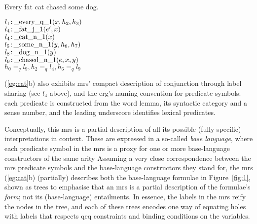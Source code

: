 \begin{examples}
\item   \label{eg:cat}
\begin{subexamples}
\item
Every fat cat chased some dog.
\item   $l_1\colon\!\mbox{\_every\_q\_1}(x,h_2,h_3)$\\
$l_4\colon\!\mbox{\_fat\_j\_1}(e',x)$\\
$l_4\colon\!\mbox{\_cat\_n\_1}(x)$\\
$l_5\colon\!\mbox{\_some\_n\_1}(y,h_6,h_7)$\\
$l_8\colon\!\mbox{\_dog\_n\_1}(y)$\\
$l_9\colon\!\mbox{\_chased\_n\_1}(e,x,y)$\\
$h_0 =_q l_9, h_2 =_q l_4, h_6 =_q l_9$
\end{subexamples}
\end{examples}
(\ref{eg:cat}b) also exhibits {\sc mrs}' compact description of
conjunction through label sharing (see $l_4$ above), and the {\sc
  erg}'s naming convention for predicate symbols: each predicate is
constructed from the word lemma, its syntactic category and a sense
number, and the leading underscore identifies lexical predicates.

Conceptually, this {\sc mrs} is a partial description of all its
possible (fully specific) interpretations in context.  
These are expressed in a so-called {\em base language}, where each
predicate symbol in the {\sc mrs} is a proxy for one or more
base-language constructors of the same arity
Assuming a very close
correspondence between the {\sc mrs} predicate symbols and the
base-language constructors they 
stand for, the {\sc mrs}
(\ref{eg:cat}b) (partially) describes both the base-language formulae in
Figure~\ref{fig:1}, shown as trees to emphasise that an {\sc mrs} is a
partial description of the formulae's {\em form}; not its
(base-language) entailments. 
In essence, the labels in the {\sc mrs} reify the
nodes in the tree, and each of these trees encodes one way of equating
holes with labels that respects qeq constraints and binding conditions
on the variables.

